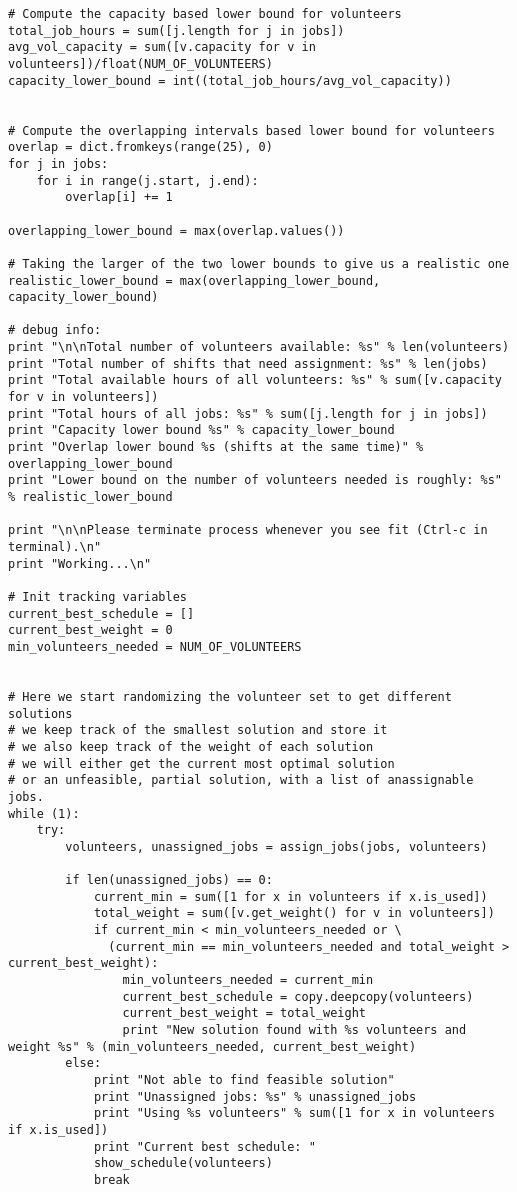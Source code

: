 \documentclass[11pt]{article}
\theoremstyle{definition}
\begin{document}
\begin{lstlisting}
# Compute the capacity based lower bound for volunteers
total_job_hours = sum([j.length for j in jobs])
avg_vol_capacity = sum([v.capacity for v in volunteers])/float(NUM_OF_VOLUNTEERS)
capacity_lower_bound = int((total_job_hours/avg_vol_capacity))


# Compute the overlapping intervals based lower bound for volunteers
overlap = dict.fromkeys(range(25), 0)
for j in jobs:
    for i in range(j.start, j.end):
        overlap[i] += 1

overlapping_lower_bound = max(overlap.values())

# Taking the larger of the two lower bounds to give us a realistic one
realistic_lower_bound = max(overlapping_lower_bound, capacity_lower_bound)

# debug info:
print "\n\nTotal number of volunteers available: %s" % len(volunteers)
print "Total number of shifts that need assignment: %s" % len(jobs)
print "Total available hours of all volunteers: %s" % sum([v.capacity for v in volunteers])
print "Total hours of all jobs: %s" % sum([j.length for j in jobs])
print "Capacity lower bound %s" % capacity_lower_bound
print "Overlap lower bound %s (shifts at the same time)" % overlapping_lower_bound
print "Lower bound on the number of volunteers needed is roughly: %s" % realistic_lower_bound

print "\n\nPlease terminate process whenever you see fit (Ctrl-c in terminal).\n"
print "Working...\n"

# Init tracking variables
current_best_schedule = []
current_best_weight = 0
min_volunteers_needed = NUM_OF_VOLUNTEERS


# Here we start randomizing the volunteer set to get different solutions
# we keep track of the smallest solution and store it
# we also keep track of the weight of each solution
# we will either get the current most optimal solution
# or an unfeasible, partial solution, with a list of anassignable jobs.
while (1):
    try:
        volunteers, unassigned_jobs = assign_jobs(jobs, volunteers)

        if len(unassigned_jobs) == 0:
            current_min = sum([1 for x in volunteers if x.is_used])
            total_weight = sum([v.get_weight() for v in volunteers])
            if current_min < min_volunteers_needed or \
              (current_min == min_volunteers_needed and total_weight > current_best_weight):
                min_volunteers_needed = current_min
                current_best_schedule = copy.deepcopy(volunteers)
                current_best_weight = total_weight
                print "New solution found with %s volunteers and weight %s" % (min_volunteers_needed, current_best_weight)
        else:
            print "Not able to find feasible solution"
            print "Unassigned jobs: %s" % unassigned_jobs
            print "Using %s volunteers" % sum([1 for x in volunteers if x.is_used])
            print "Current best schedule: "
            show_schedule(volunteers)
            break


\end{lstlisting}
\end{document}
